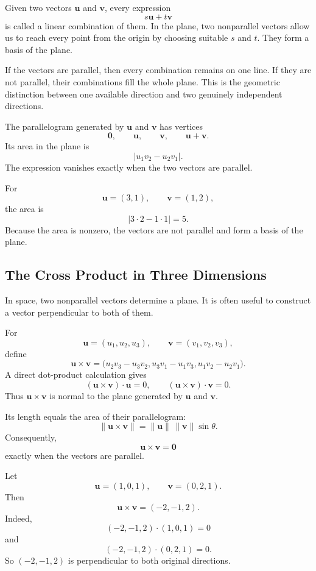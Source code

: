 Given two vectors $\mathbf u$ and $\mathbf v$, every expression
\[
s\mathbf u+t\mathbf v
\]
is called a linear combination of them.  In the plane, two nonparallel vectors
allow us to reach every point from the origin by choosing suitable $s$ and $t$.
They form a basis of the plane.

If the vectors are parallel, then every combination remains on one line.  If
they are not parallel, their combinations fill the whole plane.  This is the
geometric distinction between one available direction and two genuinely
independent directions.

The parallelogram generated by $\mathbf u$ and $\mathbf v$ has vertices
\[
\mathbf0,
\qquad
\mathbf u,
\qquad
\mathbf v,
\qquad
\mathbf u+\mathbf v.
\]
Its area in the plane is
\[
|u_1v_2-u_2v_1|.
\]
The expression vanishes exactly when the two vectors are parallel.

\begin{examplebox}
For
\[
\mathbf u=(3,1),
\qquad
\mathbf v=(1,2),
\]
the area is
\[
|3\cdot2-1\cdot1|=5.
\]
Because the area is nonzero, the vectors are not parallel and form a basis of
the plane.
\end{examplebox}

\subsection{The Cross Product in Three Dimensions}

In space, two nonparallel vectors determine a plane.  It is often useful to
construct a vector perpendicular to both of them.

For
\[
\mathbf u=(u_1,u_2,u_3),
\qquad
\mathbf v=(v_1,v_2,v_3),
\]
define
\[
\mathbf u\times\mathbf v
=
\bigl(
 u_2v_3-u_3v_2,
 u_3v_1-u_1v_3,
 u_1v_2-u_2v_1
\bigr).
\]
A direct dot-product calculation gives
\[
(\mathbf u\times\mathbf v)\cdot\mathbf u=0,
\qquad
(\mathbf u\times\mathbf v)\cdot\mathbf v=0.
\]
Thus $\mathbf u\times\mathbf v$ is normal to the plane generated by
$\mathbf u$ and $\mathbf v$.

Its length equals the area of their parallelogram:
\[
\|\mathbf u\times\mathbf v\|
=
\|\mathbf u\|\,\|\mathbf v\|\sin\theta.
\]
Consequently,
\[
\mathbf u\times\mathbf v=\mathbf0
\]
exactly when the vectors are parallel.

\begin{examplebox}
Let
\[
\mathbf u=(1,0,1),
\qquad
\mathbf v=(0,2,1).
\]
Then
\[
\mathbf u\times\mathbf v
=
(-2,-1,2).
\]
Indeed,
\[
(-2,-1,2)\cdot(1,0,1)=0
\]
and
\[
(-2,-1,2)\cdot(0,2,1)=0.
\]
So $(-2,-1,2)$ is perpendicular to both original directions.
\end{examplebox}

